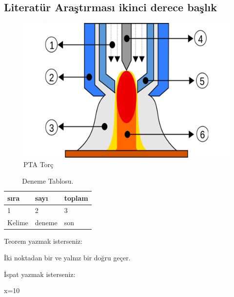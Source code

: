 \subsection{Literatür Araştırması ikinci derece başlık}
\lipsum[1-2]
\begin{figure}[h]
\centering
\includegraphics[width=\textwidth]{gorseller/ptaTorc}
\caption{PTA Torç}\label{fig:PtaTorc1}
\end{figure}
\lipsum[1-2]
\begin{table}
\centering
\caption{Deneme Tablosu.}\label{tab:den1}
\begin{tabular}{|l|l|l|}
\hline
sıra   & sayı   & toplam \\ \hline
1      & 2      & 3      \\ \hline
Kelime & deneme & son    \\ \hline
\end{tabular}
\end{table}

Teorem yazmak isterseniz:
\begin{theorem}[Öklid]
 İki noktadan bir ve yalnız bir doğru geçer.
\end{theorem}

İspat yazmak isterseniz:
\begin{ispat}
x=10
\end{ispat}

